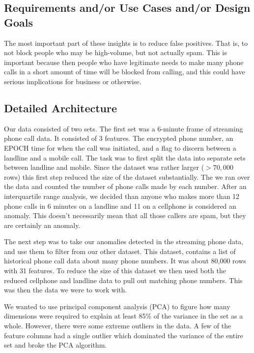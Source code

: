 \documentclass[20pt]{article} %
\begin{document}
\subsection{Requirements and/or Use Cases and/or Design Goals}
The most important part of these insights is to reduce false positives.  That is, to not block people who may be high-volume, but not actually spam.  This is important because then people who have legitimate needs to make many phone calls in a short amount of time will be blocked from calling, and this could have serious implications for business or otherwise.
\subsection{Detailed Architecture}
Our data consisted of two sets.  The first set was a 6-minute frame of streaming phone call data.  It consisted of 3 features.  The encrypted phone number, an EPOCH time for when the call was initiated, and a flag to discern between a landline and a mobile call.  The task was to first split the data into separate sets between landline and mobile.  Since the dataset was rather larger ($>70,000$ rows) this first step reduced the size of the dataset substantially.  The we ran over the data and counted the number of phone calls made by each number.  After an interquartile range analysis, we decided than anyone who makes more than 12 phone calls in 6 minutes on a landline and 11 on a cellphone is considered an anomaly.  This doesn’t necessarily mean that all those callers are spam, but they are certainly an anomaly.  

The next step was to take our anomalies detected in the streaming phone data, and use them to filter from our other dataset.  This dataset, contains a list of historical phone call data about many phone numbers.  It was about 80,000 rows with 31 features.  To reduce the size of this dataset we then used both the reduced cellphone and landline data to pull out matching phone numbers.  This was then the data we were to work with.  

We wanted to use principal component analysis (PCA) to figure how many dimensions were required to explain at least 85\% of the variance in the set as a whole.  However, there were some extreme outliers in the data.  A few of the feature columns had a single outlier which dominated the variance of the entire set and broke the PCA algorithm. 
\end{document}

